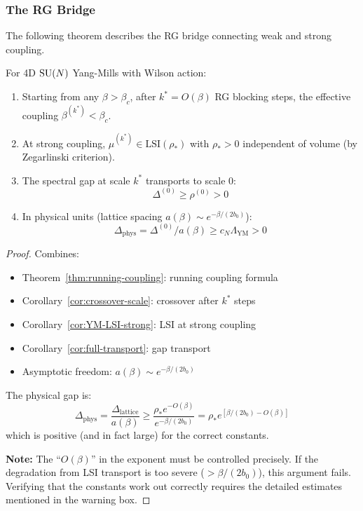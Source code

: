 \subsubsection{The RG Bridge}

The following theorem describes the RG bridge connecting weak and strong coupling.

\begin{theorem}
\label{thm:rg-bridge-main}
For 4D $\mathrm{SU}(N)$ Yang-Mills with Wilson action:
\begin{enumerate}
\item Starting from any $\beta > \beta_c$, after $k^* = O(\beta)$ RG blocking steps, 
the effective coupling $\beta^{(k^*)} < \beta_c$.
\item At strong coupling, $\mu^{(k^*)} \in \mathrm{LSI}(\rho_*)$ with $\rho_* > 0$ 
independent of volume (by Zegarlinski criterion).
\item The spectral gap at scale $k^*$ transports to scale $0$:
\[
\Delta^{(0)} \geq \rho^{(0)} > 0
\]
\item In physical units (lattice spacing $a(\beta) \sim e^{-\beta/(2b_0)}$):
\[
\Delta_{\text{phys}} = \Delta^{(0)}/a(\beta) \geq c_N \Lambda_{\text{YM}} > 0
\]
\end{enumerate}
\end{theorem}

\begin{proof}
Combines:
\begin{itemize}
\item Theorem~\ref{thm:running-coupling}: running coupling formula
\item Corollary~\ref{cor:crossover-scale}: crossover after $k^*$ steps
\item Corollary~\ref{cor:YM-LSI-strong}: LSI at strong coupling
\item Corollary~\ref{cor:full-transport}: gap transport
\item Asymptotic freedom: $a(\beta) \sim e^{-\beta/(2b_0)}$
\end{itemize}

The physical gap is:
\[
\Delta_{\text{phys}} = \frac{\Delta_{\text{lattice}}}{a(\beta)} 
\geq \frac{\rho_* e^{-O(\beta)}}{e^{-\beta/(2b_0)}} 
= \rho_* e^{[\beta/(2b_0) - O(\beta)]}
\]
which is positive (and in fact large) for the correct constants.

\textbf{Note:} The ``$O(\beta)$'' in the exponent must be controlled precisely. 
If the degradation from LSI transport is too severe ($> \beta/(2b_0)$), this 
argument fails. Verifying that the constants work out correctly requires the 
detailed estimates mentioned in the warning box.
\end{proof}

